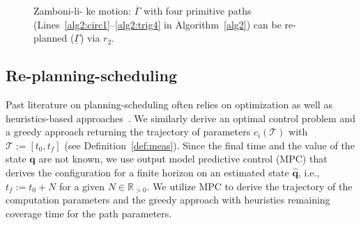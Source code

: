 \documentclass[letterpaper,10pt,journal,twoside]{IEEEtran}
\newcommand{\figpath}{./figures}
\theoremstyle{definition}
\begin{document}
\begin{figure}[t]
  \vspace*{-1ex}
  \footnotesize
  \begin{minipage}[l]{0.7\columnwidth}
    \centering
    
  \end{minipage}\hfill
  \begin{minipage}[l]{0.26\columnwidth}
    \caption{Zamboni-li- ke motion: $\overline{\Gamma}$ with four primitive paths (Lines~\ref{alg2:circ1}--\ref{alg2:trig4} in Algorithm~\ref{alg2}) can be re-planned ($\underline{\Gamma}$) {\color{blue}via} $r_2$.%
    }
    \label{fig:zambo}
  \end{minipage}
  \vspace*{-5ex}
\end{figure}

\subsection{Re-planning-scheduling}
\label{sec:repla-algo}

Past literature on planning-scheduling often relies on %
optimization {\color{blue} as well as heuristics-based} approaches~\cite{brateman2006energy,zhang2007low,ondruska2015scheduled,lahijanian2018resource}. We similarly derive an optimal control problem {\color{blue}and a greedy approach} returning the trajectory of parameters $c_i(\mathcal{T})$ with $\mathcal{T}:=[t_0,t_f]$ (see Definition~\ref{def:meas}). Since the final time %
and the %
value of the state $\mathbf{q}$ are not known, we use %
output model predictive control (MPC) that derives the configuration for a finite horizon on an estimated state $\hat{\mathbf{q}}$, i.e., $t_f:=t_0+N$ for a given $N\in\mathbb{R}_{>0}$.%
{\color{blue} We utilize MPC to derive the trajectory of the computation parameters and the greedy approach with heuristics remaining coverage time for the path parameters.}
\end{document}
